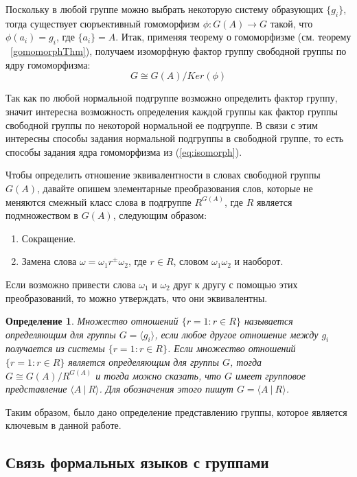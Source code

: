 \documentclass[14pt]{matmex-diploma-custom}
\newtheorem{defn}{Определение}[subsection]
\begin{document}
Поскольку в любой группе можно выбрать некоторую систему образующих $ \{g_i \} $, тогда существует
сюръективный гомоморфизм $ \phi: G (A) \to G $ такой, что $ \phi (a_i) = g_i $,
где $ \{a_i \} = A $. Итак, применяя теорему о гомоморфизме (см. теорему ~\ref{gomomorphThm}), получаем изоморфную фактор группу свободной группы по ядру гомоморфизма:
\begin{equation} \label{eq:isomorph}
  G \cong G (A) / Ker (\phi)  
\end{equation}

Так как по любой нормальной подгруппе возможно определить фактор группу, значит интересна возможность определения каждой группы
как фактор группы свободной группы по некоторой нормальной ее подгруппе.
В связи с этим интересны способы задания нормальной подгруппы в свободной группе, то есть способы задания ядра гомоморфизма из (\ref{eq:isomorph}).

Чтобы определить отношение эквивалентности в словах свободной группы $G(A)$, давайте опишем элементарные преобразования слов, которые не меняются
смежный класс слова в подгруппе $ R^{G (A)} $, где $ R $ является подмножеством в $ G (A) $, следующим образом:
\begin{enumerate}
\item Сокращение.
\item Замена слова $\omega = \omega_1 r^{\pm} \omega_2$, где $r \in R$, словом $\omega_1 \omega_2$ и наоборот.
\end{enumerate}

Если возможно привести слова $ \omega_1 $ и $ \omega_2 $ друг к
другу с помощью этих преобразований, то можно утверждать, что они эквивалентны.

\begin{defn}
Множество отношений $ \{r = 1: r \in R \} $ называется определяющим для группы
$ G = \langle g_i \rangle $, если любое другое отношение между
$ g_i $ получается из системы $ \{r = 1: r \in R \} $. Если множество отношений
$ \{r = 1: r \in R \} $ является определяющим для группы $ G $, тогда $ G \cong G (A)/R^{G (A)} $
и тогда можно сказать, что $ G $ имеет групповое представление $ \langle A ~|~ R \rangle $.
Для обозначения этого пишут $G = \langle A ~|~ R \rangle $.
\end{defn}

Таким образом, было дано определение представлению группы, которое является ключевым в данной работе. 

\subsection{Связь формальных языков с группами}
\end{document}
